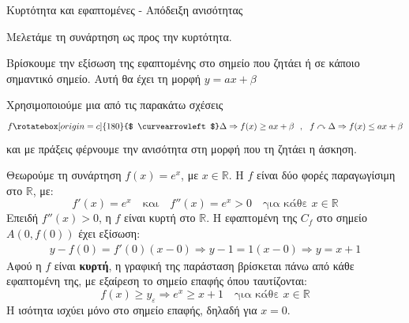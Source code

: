 \begin{askhsh}{Κυρτότητα και εφαπτομένες - Απόδειξη ανισότητας}
\bhmata\begin{bhma}
\item Μελετάμε τη συνάρτηση ως προς την κυρτότητα.
\item Βρίσκουμε την εξίσωση της εφαπτομένης στο σημείο που ζητάει ή σε κάποιο σημαντικό σημείο. Αυτή θα έχει τη μορφή $ y=ax+\beta $
\item Χρησιμοποιούμε μια από τις παρακάτω σχέσεις
\[ f\rotatebox[origin=c]{180}{$ \curvearrowleft $}\Delta\Rightarrow f(x)\geq ax+\beta\ \ ,\ \ f\curvearrowright\Delta\Rightarrow f(x)\leq ax+\beta \]
και με πράξεις φέρνουμε την ανισότητα στη μορφή που τη ζητάει η άσκηση.
\end{bhma}
\end{askhsh}

\lysh
Θεωρούμε τη συνάρτηση $f(x) = e^x$, με $x \in \mathbb{R}$. Η $f$ είναι δύο φορές παραγωγίσιμη στο $\mathbb{R}$, με:
\[ f'(x) = e^x \quad \text{και} \quad f''(x) = e^x > 0 \quad \text{για κάθε } x \in \mathbb{R} \]
Επειδή $f''(x) > 0$, η $f$ είναι κυρτή στο $\mathbb{R}$.
Η εφαπτομένη της $C_f$ στο σημείο $A(0, f(0))$ έχει εξίσωση:
\begin{gather*}
y - f(0) = f'(0)(x - 0) \Rightarrow y - 1 = 1(x - 0) \Rightarrow y = x + 1
\end{gather*}
Αφού η $f$ είναι \textbf{κυρτή}, η γραφική της παράσταση βρίσκεται πάνω από κάθε εφαπτομένη της, με εξαίρεση το σημείο επαφής όπου ταυτίζονται:
\[ f(x) \geq y_{\varepsilon} \Rightarrow e^x \geq x + 1 \quad \text{για κάθε } x \in \mathbb{R} \]
Η ισότητα ισχύει μόνο στο σημείο επαφής, δηλαδή για $x = 0$.

